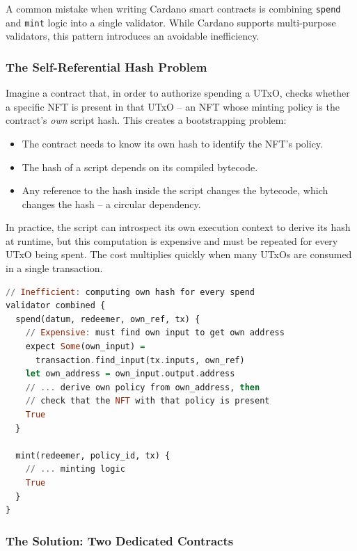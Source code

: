 A common mistake when writing Cardano smart contracts is combining \texttt{spend} and \texttt{mint} logic into a single validator. While Cardano supports multi-purpose validators, this pattern introduces an avoidable inefficiency.

\subsubsection{The Self-Referential Hash Problem}

Imagine a contract that, in order to authorize spending a UTxO, checks whether a specific NFT is present in that UTxO -- an NFT whose minting policy is the contract's \textit{own} script hash. This creates a bootstrapping problem:

\begin{itemize}
    \item The contract needs to know its own hash to identify the NFT's policy.
    \item The hash of a script depends on its compiled bytecode.
    \item Any reference to the hash inside the script changes the bytecode, which changes the hash -- a circular dependency.
\end{itemize}

In practice, the script can introspect its own execution context to derive its hash at runtime, but this computation is expensive and must be repeated for every UTxO being spent. The cost multiplies quickly when many UTxOs are consumed in a single transaction.

\begin{lstlisting}[language=haskell, caption=Costly self-referential hash in a combined validator]
// Inefficient: computing own hash for every spend
validator combined {
  spend(datum, redeemer, own_ref, tx) {
    // Expensive: must find own input to get own address
    expect Some(own_input) =
      transaction.find_input(tx.inputs, own_ref)
    let own_address = own_input.output.address
    // ... derive own policy from own_address, then
    // check that the NFT with that policy is present
    True
  }

  mint(redeemer, policy_id, tx) {
    // ... minting logic
    True
  }
}
\end{lstlisting}

\subsubsection{The Solution: Two Dedicated Contracts}

